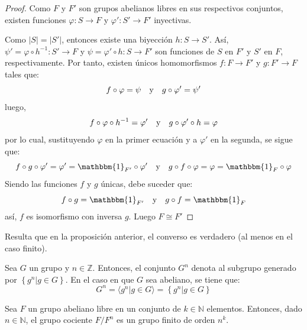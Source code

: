 \documentclass[12pt]{report}
\theoremstyle{largebreak}
\newcommand\abs[1]{\ensuremath{\left|#1\right|}}
\newcommand\cf[3]{\ensuremath{#1:#2\rightarrow#3}}
\newcommand{\bbm}[1]{\mathbbm{#1}}
\begin{document}
    \begin{proof}
        Como $F$ y $F'$ son grupos abelianos libres en sus respectivos conjuntos, existen funciones $\cf{\varphi}{S}{F}$ y $\cf{\varphi'}{S'}{F'}$ inyectivas.

        Como $\abs{S}=\abs{S'}$, entonces existe una biyección $\cf{h}{S}{S'}$. Así, $\cf{\psi'=\varphi\circ h^{-1}}{S'}{F}$ y $\cf{\psi=\varphi'\circ h}{S}{F'}$ son funciones de $S$ en $F'$ y $S'$ en $F$, respectivamente. Por tanto, existen únicos homomorfismos $\cf{f}{F}{F'}$ y $\cf{g}{F'}{F}$ tales que:
        \begin{equation*}
            f\circ \varphi=\psi\quad\textup{y}\quad g\circ\varphi'=\psi'
        \end{equation*}
        luego,
        \begin{equation*}
            f\circ\varphi\circ h^{-1}=\varphi'\quad\textup{y}\quad g\circ\varphi'\circ h=\varphi
        \end{equation*}
        por lo cual, sustituyendo $\varphi$ en la primer ecuación y a $\varphi'$ en la segunda, se sigue que:
        \begin{equation*}
            f\circ g\circ\varphi'=\varphi'=\bbm{1}_{F'}\circ\varphi' \quad\textup{y}\quad g\circ f\circ\varphi=\varphi=\bbm{1}_{F}\circ\varphi
        \end{equation*}
        Siendo las funciones $f$ y $g$ únicas, debe suceder que:
        \begin{equation*}
            f\circ g=\bbm{1}_{ F'}\quad\textup{y}\quad g\circ f=\bbm{1}_{ F}
        \end{equation*}
        así, $f$ es isomorfismo con inversa $g$. Luego $F\cong F'$
    \end{proof}

    Resulta que en la proposición anterior, el converso es verdadero (al menos en el caso finito).

    \begin{mydef}
        Sea $G$ un grupo y $n\in\mathbb{Z}$. Entonces, el conjunto $G^n$ denota al subgrupo generado por $\left\{g^n\Big|g\in G \right\}$. En el caso en que $G$ sea abeliano, se tiene que:
        \begin{equation*}
            G^n=\langle g^n\Big|g\in G\rangle=\left\{g^n\Big|g\in G \right\}
        \end{equation*}
    \end{mydef}

    \begin{lema}
        Sea $F$ un grupo abeliano libre en un conjunto de $k\in\mathbb{N}$ elementos. Entonces, dado $n\in\mathbb{N}$, el grupo cociente $F/F^n$ es un grupo finito de orden $n^k$.
    \end{lema}
\end{document}
